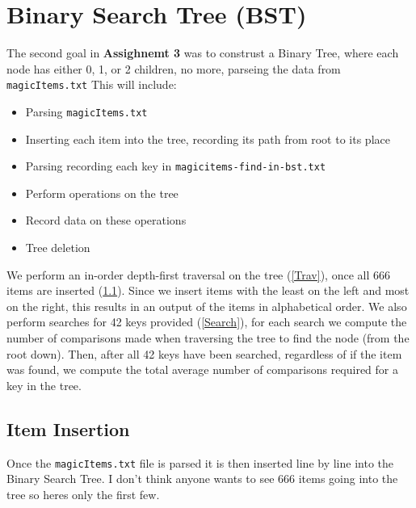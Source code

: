 \documentclass[12pt, letterpaper]{article}
\begin{document}
\section{Binary Search Tree (BST)} \label{BST}
The second goal in \textbf{Assighnemt 3} was to construst a Binary Tree, where each node has either 0, 1, or 2 children, no more, parseing the data from \texttt{magicItems.txt}
\vspace*{5pt}
\newline
This will include:
\begin{itemize}
   \item Parsing \texttt{magicItems.txt}
   \item Inserting each item into the tree, recording its path from root to its place
   \item Parsing recording each key in \texttt{magicitems-find-in-bst.txt}
   \item Perform operations on the tree
   \item Record data on these operations
   \item Tree deletion
\end{itemize}
We perform an in-order depth-first traversal on the tree (\ref{Trav}), once all 666 items are inserted (\ref{Insert}).
Since we insert items with the least on the left and most on the right, this results in an output of the items in alphabetical order.
We also perform searches for 42 keys provided (\ref{Search}), for each search we compute the number of comparisons made when traversing the tree to find the node (from the root down).
Then, after all 42 keys have been searched, regardless of if the item was found, we compute the total average number of comparisons required for a key in the tree.

\subsection{Item Insertion} \label{Insert}
Once the \texttt{magicItems.txt} file is parsed it is then inserted line by line into the Binary Search Tree.
I don't think anyone wants to see 666 items going into the tree so heres only the first few.
\end{document}
